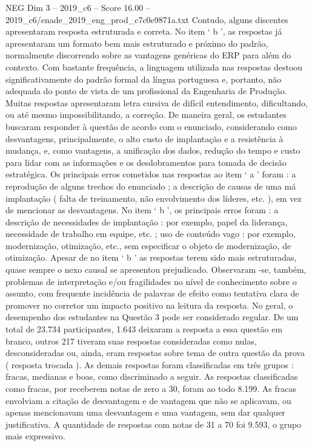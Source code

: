 \begin{textsample}{NEG Dim 3 – 2019\_c6 – Score 16.00 – 2019\_c6/enade\_2019\_eng\_prod\_c7c0e9871a.txt}
Contudo, alguns discentes apresentaram resposta estruturada e correta.
No item ‘ b ’, as respostas já apresentaram um formato bem mais estruturado e próximo do padrão, normalmente discorrendo sobre as vantagens genéricas do ERP para além do contexto.
Com bastante frequência, a linguagem utilizada nas respostas destoou significativamente do padrão formal da língua portuguesa e, portanto, não adequada do ponto de vista de um profissional da Engenharia de Produção.
Muitas respostas apresentaram letra cursiva de difícil entendimento, dificultando, ou até mesmo impossibilitando, a correção.
De maneira geral, os estudantes buscaram responder à questão de acordo com o enunciado, considerando como desvantagens, principalmente, o alto custo de implantação e a resistência à mudança, e, como vantagens, a unificação dos dados, redução do tempo e custo para lidar com as informações e os desdobramentos para tomada de decisão estratégica.
Os principais erros cometidos nas respostas ao item ‘ a ’ foram : a reprodução de alguns trechos do enunciado ; a descrição de causas de uma má implantação ( falta de treinamento, não envolvimento dos líderes, etc. ), em vez de mencionar as desvantagens.
No item ‘ b ’, os principais erros foram : a descrição de necessidades de implantação : por exemplo, papel da liderança, necessidade de trabalho em equipe, etc. ; uso de conteúdo vago : por exemplo, modernização, otimização, etc., sem especificar o objeto de modernização, de otimização.
Apesar de no item ‘ b ’ as respostas terem sido mais estruturadas, quase sempre o nexo causal se apresentou prejudicado.
Observaram -se, também, problemas de interpretação e/ou fragilidades no nível de conhecimento sobre o assunto, com frequente incidência de palavras de efeito como tentativa clara de promover no corretor um impacto positivo na leitura da resposta.
No geral, o desempenho dos estudantes na Questão 3 pode ser considerado regular.
De um total de 23.734 participantes, 1.643 deixaram a resposta a essa questão em branco, outros 217 tiveram suas respostas consideradas como nulas, desconsideradas ou, ainda, eram respostas sobre tema de outra questão da prova ( resposta trocada ).
As demais respostas foram classificadas em três grupos : fracas, medianas e boas, como discriminado a seguir.
As respostas classificadas como fracas, por receberem notas de zero a 30, foram ao todo 8.199.
As fracas envolviam a citação de desvantagem e de vantagem que não se aplicavam, ou apenas mencionavam uma desvantagem e uma vantagem, sem dar qualquer justificativa.
A quantidade de respostas com notas de 31 a 70 foi 9.593, o grupo mais expressivo.

\end{textsample}

